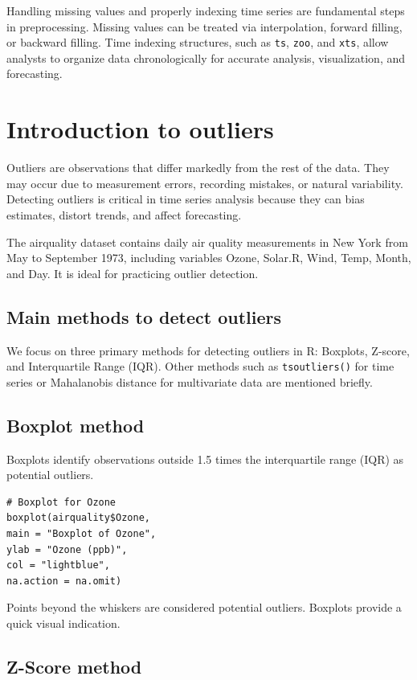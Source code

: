 \documentclass[12pt,a4paper]{article}
\begin{document}
Handling missing values and properly indexing time series are fundamental steps in preprocessing. Missing values can be treated via interpolation, forward filling, or backward filling. Time indexing structures, such as \texttt{ts}, \texttt{zoo}, and \texttt{xts}, allow analysts to organize data chronologically for accurate analysis, visualization, and forecasting.

\section{Introduction to outliers}

Outliers are observations that differ markedly from the rest of the data. They may occur due to measurement errors, recording mistakes, or natural variability. Detecting outliers is critical in time series analysis because they can bias estimates, distort trends, and affect forecasting.

The airquality dataset contains daily air quality measurements in New York from May to September 1973, including variables Ozone, Solar.R, Wind, Temp, Month, and Day. It is ideal for practicing outlier detection.

\subsection{Main methods to detect outliers}

We focus on three primary methods for detecting outliers in R: Boxplots, Z-score, and Interquartile Range (IQR). Other methods such as \texttt{tsoutliers()} for time series or Mahalanobis distance for multivariate data are mentioned briefly.

\subsection{Boxplot method}

Boxplots identify observations outside 1.5 times the interquartile range (IQR) as potential outliers.

\begin{verbatim}
# Boxplot for Ozone
boxplot(airquality$Ozone,
main = "Boxplot of Ozone",
ylab = "Ozone (ppb)",
col = "lightblue",
na.action = na.omit)
\end{verbatim}

Points beyond the whiskers are considered potential outliers. Boxplots provide a quick visual indication.

\subsection{Z-Score method}
\end{document}
